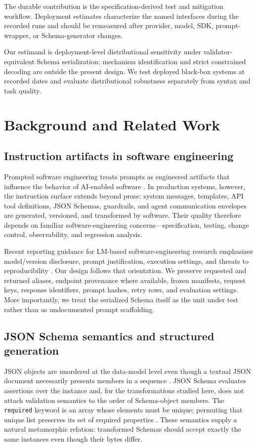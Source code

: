 \documentclass[11pt,a4paper]{article}
\begin{document}
The durable contribution is the specification-derived test and mitigation workflow. Deployment estimates characterize the named interfaces during the recorded runs and should be remeasured after provider, model, SDK, prompt-wrapper, or Schema-generator changes.

Our estimand is deployment-level distributional sensitivity under validator-equivalent Schema serialization; mechanism identification and strict constrained decoding are outside the present design. We test deployed black-box systems at recorded dates and evaluate distributional robustness separately from syntax and task quality.

\section{Background and Related Work}
\subsection{Instruction artifacts in software engineering}
Prompted software engineering treats prompts as engineered artifacts that influence the behavior of AI-enabled software \citep{kim2023promptedse}. In production systems, however, the instruction surface extends beyond prose: system messages, templates, API tool definitions, JSON Schemas, guardrails, and agent communication envelopes are generated, versioned, and transformed by software. Their quality therefore depends on familiar software-engineering concerns---specification, testing, change control, observability, and regression analysis.

Recent reporting guidance for LM-based software-engineering research emphasizes model/version disclosure, prompt justification, execution settings, and threats to reproducibility \citep{korn2026reporting}. Our design follows that orientation. We preserve requested and returned aliases, endpoint provenance where available, frozen manifests, request keys, response identifiers, prompt hashes, retry rows, and evaluation settings. More importantly, we treat the serialized Schema itself as the unit under test rather than as undocumented prompt scaffolding.

\subsection{JSON Schema semantics and structured generation}
JSON objects are unordered at the data-model level even though a textual JSON document necessarily presents members in a sequence \citep{rfc8259}. JSON Schema evaluates assertions over the instance and, for the transformations studied here, does not attach validation semantics to the order of Schema-object members. The \texttt{required} keyword is an array whose elements must be unique; permuting that unique list preserves its set of required properties \citep{jsonschema2020validation}. These semantics supply a natural metamorphic relation: transformed Schemas should accept exactly the same instances even though their bytes differ.
\end{document}
